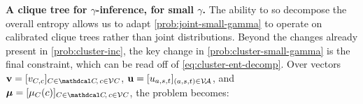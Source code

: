 \documentclass{article}
\begin{document}
\textbf{A clique tree for $\gamma$-inference, for small $\gamma$.}
The ability to so decompose the overall entropy allows us to adapt 
\eqref{prob:joint-small-gamma} to operate on calibrated clique trees 
rather than joint distributions. 
Beyond the changes already present in \eqref{prob:cluster-inc},
the key change in \eqref{prob:cluster-small-gamma} 
is the final constraint, which can be read off of 
\eqref{eq:cluster-ent-decomp}.
%
Over
vectors $\mat v = [v_{C,c}]_{C \in \mathdcal C\!,\,c \in \V C}$,
$\mathbf{u} = [u_{a,s,t}]_{(a,s,t) \in \mathcal V\!\mathcal A}$,
and $\bmu = [ \mu_{C}(c) ]_{C \in \mathdcal C\!,\,c \in \V C}$,
the problem becomes: 
\end{document}
